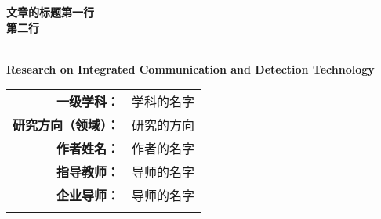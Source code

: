 \begin{titlepage}
    \centering
    \thispagestyle{empty} 
    \erhao \textbf{文章的标题第一行\\第二行}  %

    \Large \textbf{\\ Research on Integrated Communication and Detection Technology} %

    \vfill

    \begin{table}[!b]
        \centering
        \fontsize{12pt}{20pt}\selectfont
        \begin{tabular}{rm{}}
            \textbf{一级学科：} & 学科的名字 \\ \cline{2-2}
            \textbf{研究方向（领域）：} & 研究的方向 \\ \cline{2-2}
            \textbf{作者姓名：} & 作者的名字 \\ \cline{2-2}
            \textbf{指导教师：} & 导师的名字 \\ \cline{2-2}
            \textbf{企业导师：} & 导师的名字 \\ \cline{2-2}
            \multicolumn{2}{c}{}
            \label{tab:Names}
        \end{tabular}
    \end{table}


\end{titlepage}
